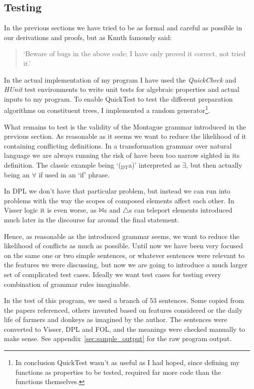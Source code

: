\documentclass[12pt]{article}
\begin{document}
\subsection{Testing}
In the previous sections we have tried to be as formal and careful as possible in our derivations and proofs, but as Knuth famously said:

\begin{quotation}
`Beware of bugs in the above code; I have only proved it correct, not tried it.'
\end{quotation}

In the actual implementation of my program I have used the \emph{QuickCheck} and \emph{HUnit} test environments to write unit tests for algebraic properties and actual inputs to my program. To enable QuickTest to test the different preparation algorithms on constituent trees, I implemented a random generator\footnote{In conclusion QuickTest wasn't as useful as I had hoped, since defining my functions as properties to be tested, required far more code than the functions themselves.}.

What remains to test is the validity of the Montague grammar introduced in the previous section. As reasonable as it seems we want to reduce the likelihood of it containing conflicting definitions. In a transformation grammar over natural language we are always running the risk of have been too narrow sighted in its definition. The classic example being `($_\text{DT}$a)' interpreted as $\exists$, but then actually being an $\forall$ if used in an `if' phrase.

In DPL we don't have that particular problem, but instead we can run into problems with the way the scopes of composed elements affect each other. In Visser logic it is even worse, as $\Bowtie$s and $\triangle$s can teleport elements introduced much later in the discourse far around the final statement.

Hence, as reasonable as the introduced grammar seems, we want to reduce the likelihood of conflicts as much as possible. Until now we have been very focused on the same one or two simple sentences, or whatever sentences were relevant to the features we were discussing, but now we are going to introduce a much larger set of complicated test cases. Ideally we want test cases for testing every combination of grammar rules imaginable.

In the test of this program, we used a branch of 53 sentences. Some copied from the papers referenced, others invented based on features considered or the daily life of farmers and donkeys as imagined by the author. The sentences were converted to Visser, DPL and FOL, and the meanings were checked manually to make sense. See appendix~\ref{sec:sample_output} for the raw program output.
\end{document}
